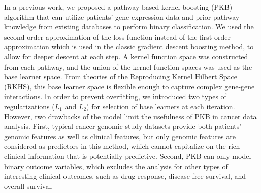 \documentclass[a4paper,12pt]{article}
\begin{document}

In a previous work,\cite{zeng2019pathway} we proposed a pathway-based kernel boosting (PKB) algorithm that can utilize patients' gene expression data and prior pathway knowledge from existing databases to perform binary classification. We used the second order approximation of the loss function instead of the first order approximation which is used in the classic gradient descent boosting method, to allow for deeper descent at each step. A kernel function space was constructed from each pathway, and the union of the kernel function spaces was used as the base learner space. From theories of the Reproducing Kernel Hilbert Space (RKHS)\citep{friedman2001elements}, this base learner space is flexible enough to capture complex gene-gene interactions. In order to prevent overfitting, we introduced two types of regularizations ($L_1$ and $L_2$) for selection of base learners at each iteration. However, two drawbacks of the model limit the usefulness of PKB in cancer data analysis. First, typical cancer genomic study datasets provide both patients' genomic features as well as clinical features, but only genomic features are considered as predictors in this method, which cannot capitalize on the rich clinical information that is potentially predictive. Second, PKB can only model binary outcome variables, which excludes the analysis for other types of interesting clinical outcomes, such as drug response, disease free survival, and overall survival. 
	
\end{document}
